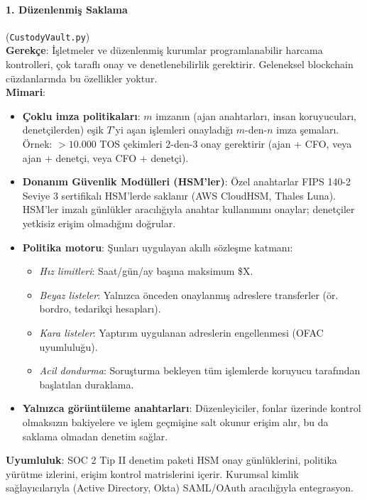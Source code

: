 \documentclass[11pt]{article}
\begin{document}
\paragraph{1. Düzenlenmiş Saklama} (\texttt{CustodyVault.py})\\
\textbf{Gerekçe}: İşletmeler ve düzenlenmiş kurumlar programlanabilir harcama kontrolleri, çok taraflı onay ve denetlenebilirlik gerektirir. Geleneksel blockchain cüzdanlarında bu özellikler yoktur.\\
\textbf{Mimari}:
\begin{itemize}[noitemsep]
  \item \textbf{Çoklu imza politikaları}: $m$ imzanın (ajan anahtarları, insan koruyucuları, denetçilerden) eşik $T$'yi aşan işlemleri onayladığı $m$-den-$n$ imza şemaları. Örnek: $>10.000$ TOS çekimleri 2-den-3 onay gerektirir (ajan + CFO, veya ajan + denetçi, veya CFO + denetçi).
  \item \textbf{Donanım Güvenlik Modülleri (HSM'ler)}: Özel anahtarlar FIPS 140-2 Seviye 3 sertifikalı HSM'lerde saklanır (AWS CloudHSM, Thales Luna). HSM'ler imzalı günlükler aracılığıyla anahtar kullanımını onaylar; denetçiler yetkisiz erişim olmadığını doğrular.
  \item \textbf{Politika motoru}: Şunları uygulayan akıllı sözleşme katmanı:
    \begin{itemize}[noitemsep]
      \item \emph{Hız limitleri}: Saat/gün/ay başına maksimum \$X.
      \item \emph{Beyaz listeler}: Yalnızca önceden onaylanmış adreslere transferler (ör. bordro, tedarikçi hesapları).
      \item \emph{Kara listeler}: Yaptırım uygulanan adreslerin engellenmesi (OFAC uyumluluğu).
      \item \emph{Acil dondurma}: Soruşturma bekleyen tüm işlemlerde koruyucu tarafından başlatılan duraklama.
    \end{itemize}
  \item \textbf{Yalnızca görüntüleme anahtarları}: Düzenleyiciler, fonlar üzerinde kontrol olmaksızın bakiyelere ve işlem geçmişine salt okunur erişim alır, bu da saklama olmadan denetim sağlar.
\end{itemize}
\textbf{Uyumluluk}: SOC 2 Tip II denetim paketi HSM onay günlüklerini, politika yürütme izlerini, erişim kontrol matrislerini içerir. Kurumsal kimlik sağlayıcılarıyla (Active Directory, Okta) SAML/OAuth aracılığıyla entegrasyon.
\end{document}
